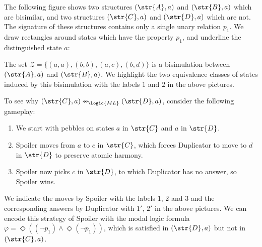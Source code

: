 \begin{example}
  The following figure shows two structures $(\str{A}, {a})$ and $(\str{B}, {a})$ which are bisimilar, and two structures $(\str{C}, {a})$ and $(\str{D}, {a})$ which are not.
  The signature of these structures contains only a single unary relation $p_{1}$.
  We draw rectangles around states which have the property $p_{1}$, and underline the distinguished state $a$:

  \vspace{1em}
  
  \vspace{-1em}

  \noindent
  The set $\mathcal{Z} = \{(a,a), (b,b), (a,c), (b,d) \}$ is a bisimulation between $(\str{A}, {a})$ and $(\str{B}, {a})$.
  We highlight the two equivalence classes of states induced by this bisimulation with the labels $1$ and $2$ in the above pictures.

  \noindent
  To see why $(\str{C}, {a}) \nsim_{\Logic{ML}} (\str{D}, {a})$, consider the following gameplay:
  \begin{enumerate}
    \item We start with pebbles on states ${a}$ in $\str{C}$ and ${a}$ in $\str{D}$.
    \item Spoiler moves from ${a}$ to $c$ in $\str{C}$, which forces Duplicator to move to $d$ in $\str{D}$ to preserve atomic harmony.
    \item Spoiler now picks $c$ in $\str{D}$, to which Duplicator has no answer, so Spoiler wins.
  \end{enumerate}
  We indicate the moves by Spoiler with the labels $1$, $2$ and $3$ and the corresponding answers by Duplicator with $1'$, $2'$ in the above pictures.
  We can encode this strategy of Spoiler with the modal logic formula $\varphi = \Diamond((\neg p_{1}) \land \Diamond (\neg p_{1}))$, which is satisfied in $(\str{D}, {a})$ but not in $(\str{C}, {a})$.
\end{example}

